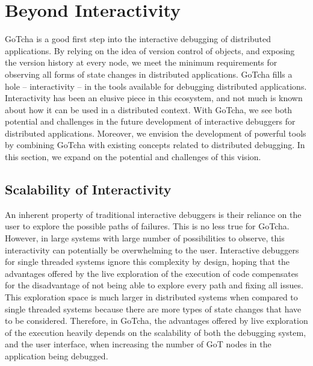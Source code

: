 \section{Beyond Interactivity}
\label{sec:discussion}

GoTcha is a good first step into the interactive debugging of distributed applications. By relying on the idea of version control of objects, and exposing the version history at every node, we meet the minimum requirements for observing all forms of state changes in distributed applications. GoTcha fills a hole -- interactivity -- in the tools available for debugging distributed applications. Interactivity has been an elusive piece in this ecosystem, and not much is known about how it can be used in a distributed context. With GoTcha, we see both potential and challenges in the future development of interactive debuggers for distributed applications. Moreover, we envision the development of powerful tools by combining GoTcha with existing concepts related to distributed debugging. In this section, we expand on the potential and challenges of this vision.


\subsection{Scalability of Interactivity}
An inherent property of traditional interactive debuggers is their reliance on the user to explore the possible paths of failures. This is no less true for GoTcha. However, in large systems with large number of possibilities to observe, this interactivity can potentially be overwhelming to the user. Interactive debuggers for single threaded systems ignore this complexity by design, hoping that the advantages offered by the live exploration of the execution of code compensates for the disadvantage of not being able to explore every path and fixing all issues. This exploration space is much larger in distributed systems when compared to single threaded systems because there are more types of state changes that have to be considered. Therefore, in GoTcha, the advantages offered by live exploration of the execution heavily depends on the scalability of both the debugging system, and the user interface, when increasing the number of GoT nodes in the application being debugged.

